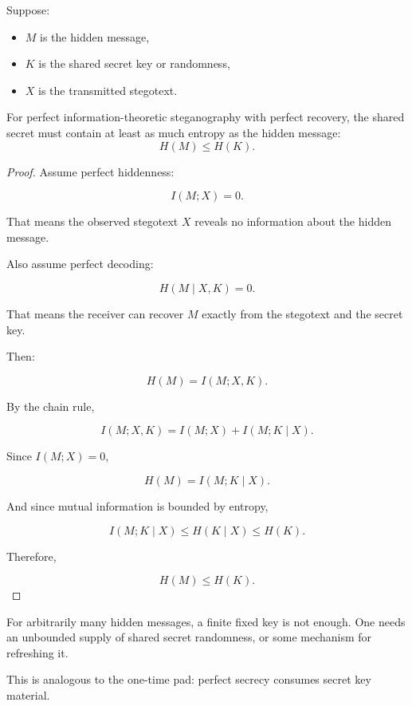 \documentclass[11pt]{article}
\begin{document}
Suppose:

\begin{itemize}
    \item $M$ is the hidden message,
    \item $K$ is the shared secret key or randomness,
    \item $X$ is the transmitted stegotext.
\end{itemize}

\begin{theorem}
\label{thm:key-entropy}
For perfect information-theoretic steganography with perfect recovery, the shared secret must contain at least as much entropy as the hidden message:
\[
\boxed{H(M)\le H(K).}
\]
\end{theorem}

\begin{proof}
Assume perfect hiddenness:

\[
I(M;X)=0.
\]

That means the observed stegotext $X$ reveals no information about the hidden message.

Also assume perfect decoding:

\[
H(M \mid X,K)=0.
\]

That means the receiver can recover $M$ exactly from the stegotext and the secret key.

Then:

\[
H(M)=I(M;X,K).
\]

By the chain rule,

\[
I(M;X,K)
=
I(M;X)+I(M;K\mid X).
\]

Since $I(M;X)=0$,

\[
H(M)=I(M;K\mid X).
\]

And since mutual information is bounded by entropy,

\[
I(M;K\mid X)\le H(K\mid X)\le H(K).
\]

Therefore,

\[
H(M)\le H(K).
\]
\end{proof}

For arbitrarily many hidden messages, a finite fixed key is not enough. One needs an unbounded supply of shared secret randomness, or some mechanism for refreshing it.

\begin{remark}
\label{rem:one-time-pad}
This is analogous to the one-time pad: perfect secrecy consumes secret key material.
\end{remark}
\end{document}
